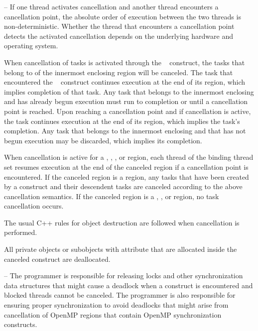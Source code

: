 \notestart
\noteheader – If one thread activates cancellation and another thread encounters a cancellation 
point, the absolute order of execution between the two threads is non-deterministic. 
Whether the thread that encounters a cancellation point detects the activated cancellation 
depends on the underlying hardware and operating system.
\noteend

When cancellation of tasks is activated through the ~ construct, the tasks that belong to  of the  
innermost enclosing  region will be canceled. The task that encountered the 
~ construct continues execution at the end of its  region, 
which implies completion of that task. Any task that belongs to the innermost enclosing 
 and has already begun execution must run to completion or until a 
cancellation point is reached. Upon reaching a cancellation point and if cancellation is active, the task continues execution at the end of its  region, which implies the task's completion. Any task that belongs to the innermost enclosing  and that 
has not begun execution may be discarded, which implies its completion.

When cancellation is active for a , , , or  region, each 
thread of the binding thread set resumes execution at the end of the canceled region if a 
cancellation point is encountered. If the canceled region is a  region, any 
tasks that have been created by a  construct and their descendent tasks are 
canceled according to the above  cancellation semantics. If the canceled 
region is a , , or  region, no task cancellation occurs.

\cppspecificstart
The usual C++ rules for object destruction are followed when cancellation is performed.
\cppspecificend

\fortranspecificstart
All private objects or subobjects with  attribute that are allocated inside 
the canceled construct are deallocated.
\fortranspecificend

\notestart
\noteheader – The programmer is responsible for releasing locks and other synchronization data structures that might cause a deadlock when a  construct is encountered and blocked threads cannot be canceled. The programmer is also responsible for ensuring proper synchronization to avoid deadlocks that might arise from cancellation of OpenMP regions that contain OpenMP synchronization constructs.
\noteend

